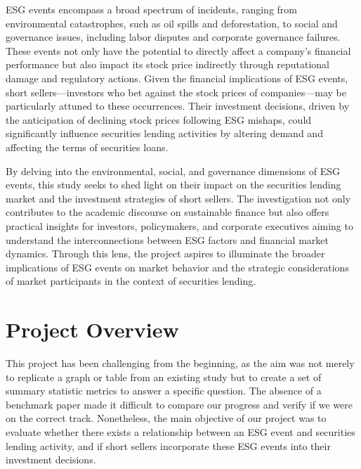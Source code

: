 ESG events encompass a broad spectrum of incidents, ranging from environmental catastrophes, such as oil spills and deforestation, to social and governance issues, including labor disputes and corporate governance failures. These events not only have the potential to directly affect a company's financial performance but also impact its stock price indirectly through reputational damage and regulatory actions. Given the financial implications of ESG events, short sellers—investors who bet against the stock prices of companies—may be particularly attuned to these occurrences. Their investment decisions, driven by the anticipation of declining stock prices following ESG mishaps, could significantly influence securities lending activities by altering demand and affecting the terms of securities loans.

By delving into the environmental, social, and governance dimensions of ESG events, this study seeks to shed light on their impact on the securities lending market and the investment strategies of short sellers. The investigation not only contributes to the academic discourse on sustainable finance but also offers practical insights for investors, policymakers, and corporate executives aiming to understand the interconnections between ESG factors and financial market dynamics. Through this lens, the project aspires to illuminate the broader implications of ESG events on market behavior and the strategic considerations of market participants in the context of securities lending.





%

\newpage
\section{Project Overview}

This project has been challenging from the beginning, as the aim was not merely to replicate a graph or table from an existing study but to create a set of summary statistic metrics to answer a specific question. The absence of a benchmark paper made it difficult to compare our progress and verify if we were on the correct track. Nonetheless, the main objective of our project was to evaluate whether there exists a relationship between an ESG event and securities lending activity, and if short sellers incorporate these ESG events into their investment decisions.

